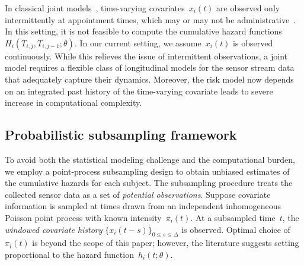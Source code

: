 \documentclass[11pt]{amsart}
\begin{document}
In classical joint models~\citep{Henderson2000, Tsiatis2004},
time-varying covariates~$x_i (t)$ are observed only intermittently at
appointment times, which may or may not be
administrative~\citep{DempseyPMCC}.  In this setting, it is not feasible
to compute the cumulative hazard functions~$H_{i} (T_{i,j}, T_{i,j-1};
\theta)$.  In our current setting, we assume~$x_{i} (t)$ is observed
continuously.  While this relieves the issue of intermittent
observations, a joint model requires a flexible class of longitudinal
models for the sensor stream data that adequately capture their
dynamics.  Moreover, the risk model now depends on an integrated past
history of the time-varying covariate leads to severe increase in
computational complexity.

\subsection{Probabilistic subsampling framework}

To avoid both the statistical modeling challenge and the computational
burden, we employ a point-process subsampling design to obtain
unbiased estimates of the cumulative hazards for each subject. The
subsampling procedure treats the collected sensor data as a set of
\emph{potential observations}. 
Suppose covariate information is sampled at times drawn from an
independent inhomogeneous Poisson point process with known
intensity~$\pi_i (t)$. At a subsampled time~$t$, the \emph{windowed
  covariate history} $\{ x_i (t-s)\}_{0 \leq s \leq \Delta}$ is
observed. Optimal choice of~$\pi_i (t)$ is beyond the scope of this
paper; however, the literature suggests setting proportional to the
hazard function~$h_i (t; \theta)$.
\end{document}
